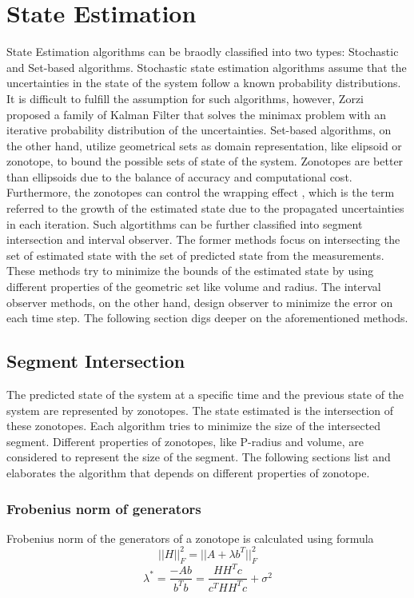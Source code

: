 \chapter{State Estimation} \label{ch:state_estimation}
State Estimation algorithms can be braodly classified into two types: Stochastic and Set-based algorithms. Stochastic state estimation algorithms assume that the uncertainties in the state of the system follow  a known probability distributions. It is difficult to fulfill the assumption for such algorithms, however, Zorzi \cite{Zorzi2017} proposed a family of Kalman Filter that solves the minimax problem with an iterative probability distribution of the uncertainties. Set-based algorithms, on the other hand, utilize geometrical sets as domain representation, like elipsoid or zonotope, to bound the possible sets of state of the system. Zonotopes are better than ellipsoids due to the balance of accuracy and computational cost. Furthermore, the zonotopes can control the wrapping effect \cite{Kuhn1998}, which is the term referred to the growth of the estimated state due to the propagated uncertainties in each iteration. Such algortithms can be further classified into segment intersection and interval observer. The former methods focus on intersecting the set of estimated state with the set of predicted state from the measurements. These methods try to minimize the bounds of the estimated state by using different properties of the geometric set like volume and radius. The interval observer methods, on the other hand, design observer to minimize the error on each time step. The following section digs deeper on the aforementioned methods.

\section{Segment Intersection} 
The predicted state of the system at a specific time and the previous state of the system are represented by zonotopes. The state estimated is the intersection of these zonotopes. Each algorithm tries to minimize the size of the intersected segment. Different properties of zonotopes, like P-radius and volume, are considered to represent the size of the segment. The following sections list and elaborates the algorithm that depends on different properties of zonotope.

\subsection{Frobenius norm of generators}
Frobenius norm of the generators of a zonotope is calculated using formula
\begin{equation}
||H||_{F}^2 = ||A + \lambda b^T||^{2}_F
\end{equation}
\begin{equation}
\label{lambdaformula}
\lambda^* = \frac{-Ab }{b^Tb}  = \frac{HH^Tc}{c^T HH^Tc} + \sigma^2
\end{equation}

